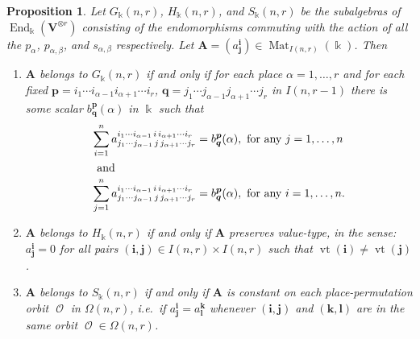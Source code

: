 \documentclass[10pt]{article}
\newtheorem{prop}[theorem]{Proposition}
\theoremstyle{definition}
\providecommand{\ie}{i.e.\ }
\DeclareMathOperator{\End}{End}
\DeclareMathOperator{\Mat}{Mat}
\DeclareMathOperator{\Orb}{\mathcal{O}}
\DeclareMathOperator{\vt}{vt}
\newcommand{\bi}{{\boldsymbol{i}}} %
\newcommand{\bj}{{\boldsymbol{j}}}
\newcommand{\bk}{{\boldsymbol{k}}}
\newcommand{\bl}{{\boldsymbol{l}}}
\newcommand{\bp}{{\boldsymbol{p}}}
\newcommand{\bq}{{\boldsymbol{q}}}
\newcommand{\bA}{\mathbf{A}}
\newcommand{\V}{\mathbf{V}} %
\begin{document}
\begin{prop}\label{prop:GHS}
 Let $G_\Bbbk(n,r)$, $H_\Bbbk(n,r)$, and $S_\Bbbk(n,r)$ be the
 subalgebras of $\End_\Bbbk( \V^{\otimes r} )$ consisting of
 the endomorphisms commuting with the action of all the $p_\alpha$,
 $p_{\alpha,\beta}$, and $s_{\alpha,\beta}$ respectively. Let $\bA =
 ( a^{\bi}_{\bj} ) \in \Mat_{I(n,r)}(\Bbbk)$. Then
\begin{enumerate}[label=(\alph*)]
\item\label{prop3.2_a} $\bA$ belongs to $G_\Bbbk(n,r)$ if and only if for each place
 $\alpha = 1, \dots, r$ and for each fixed $\bp = i_1 \cdots
 i_{\alpha-1} i_{\alpha+1}\cdots i_r$, $\bq = j_1 \cdots j_{\alpha-1}
 j_{\alpha+1} \cdots j_r$ in $I(n,r-1)$ there is some scalar
 $b^\bp_\bq(\alpha)$ in $\Bbbk$ such that
 \begin{align*}
 \sum_{i = 1}^n a^{i_1 \cdots i_{\alpha-1}\, i\, i_{\alpha+1}
 \cdots i_r}_{j_1 \cdots j_{\alpha-1}\, j\, j_{\alpha+1} \cdots
 j_r} &= b^\bp_\bq(\alpha), \text{ for any } j = 1, \dots, n
 \\ \intertext{ and} \sum_{j = 1}^n a^{i_1 \cdots i_{\alpha-1}\,
 i\, i_{\alpha+1} \cdots i_r}_{j_1 \cdots j_{\alpha-1}\, j\,
 j_{\alpha+1} \cdots j_r} &= b^\bp_\bq(\alpha), \text{ for any }
 i = 1, \dots, n.
 \end{align*}

\item\label{prop3.2_b} $\bA$ belongs to $H_\Bbbk(n,r)$ if and only if $\bA$ preserves
 value-type, in the sense: $a^{\bi}_{\bj} = 0$ for all pairs
 $(\bi,\bj) \in I(n,r) \times I(n,r)$ such that $\vt(\bi) \ne
 \vt(\bj)$.
 
\item\label{prop3.2_c} $\bA$ belongs to $S_\Bbbk(n,r)$ if and only if $\bA$ is constant
 on each place-permutation orbit $\Orb$ in $\Omega(n,r)$, \ie if
 $a^\bi_\bj = a^\bk_\bl$ whenever $(\bi,\bj)$ and $(\bk,\bl)$ are in
 the same orbit $\Orb \in \Omega(n,r)$.
\end{enumerate}
\end{prop}
\end{document}
